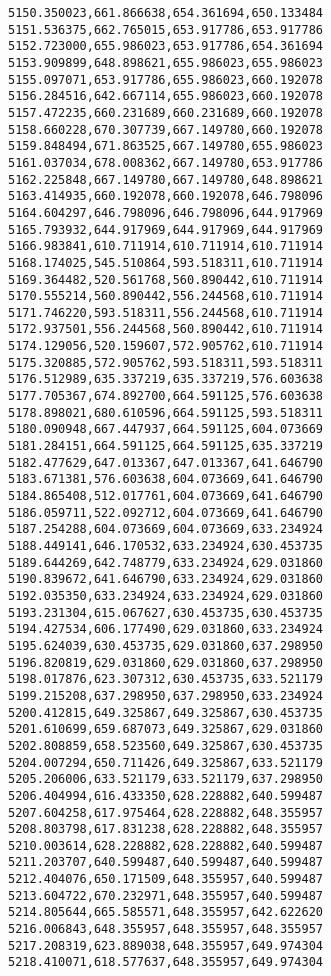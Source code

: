\documentclass[11pt]{article}
\begin{document}
\begin{Verbatim}[commandchars=\\\{\}]
5150.350023,661.866638,654.361694,650.133484
5151.536375,662.765015,653.917786,653.917786
5152.723000,655.986023,653.917786,654.361694
5153.909899,648.898621,655.986023,655.986023
5155.097071,653.917786,655.986023,660.192078
5156.284516,642.667114,655.986023,660.192078
5157.472235,660.231689,660.231689,660.192078
5158.660228,670.307739,667.149780,660.192078
5159.848494,671.863525,667.149780,655.986023
5161.037034,678.008362,667.149780,653.917786
5162.225848,667.149780,667.149780,648.898621
5163.414935,660.192078,660.192078,646.798096
5164.604297,646.798096,646.798096,644.917969
5165.793932,644.917969,644.917969,644.917969
5166.983841,610.711914,610.711914,610.711914
5168.174025,545.510864,593.518311,610.711914
5169.364482,520.561768,560.890442,610.711914
5170.555214,560.890442,556.244568,610.711914
5171.746220,593.518311,556.244568,610.711914
5172.937501,556.244568,560.890442,610.711914
5174.129056,520.159607,572.905762,610.711914
5175.320885,572.905762,593.518311,593.518311
5176.512989,635.337219,635.337219,576.603638
5177.705367,674.892700,664.591125,576.603638
5178.898021,680.610596,664.591125,593.518311
5180.090948,667.447937,664.591125,604.073669
5181.284151,664.591125,664.591125,635.337219
5182.477629,647.013367,647.013367,641.646790
5183.671381,576.603638,604.073669,641.646790
5184.865408,512.017761,604.073669,641.646790
5186.059711,522.092712,604.073669,641.646790
5187.254288,604.073669,604.073669,633.234924
5188.449141,646.170532,633.234924,630.453735
5189.644269,642.748779,633.234924,629.031860
5190.839672,641.646790,633.234924,629.031860
5192.035350,633.234924,633.234924,629.031860
5193.231304,615.067627,630.453735,630.453735
5194.427534,606.177490,629.031860,633.234924
5195.624039,630.453735,629.031860,637.298950
5196.820819,629.031860,629.031860,637.298950
5198.017876,623.307312,630.453735,633.521179
5199.215208,637.298950,637.298950,633.234924
5200.412815,649.325867,649.325867,630.453735
5201.610699,659.687073,649.325867,629.031860
5202.808859,658.523560,649.325867,630.453735
5204.007294,650.711426,649.325867,633.521179
5205.206006,633.521179,633.521179,637.298950
5206.404994,616.433350,628.228882,640.599487
5207.604258,617.975464,628.228882,648.355957
5208.803798,617.831238,628.228882,648.355957
5210.003614,628.228882,628.228882,640.599487
5211.203707,640.599487,640.599487,640.599487
5212.404076,650.171509,648.355957,640.599487
5213.604722,670.232971,648.355957,640.599487
5214.805644,665.585571,648.355957,642.622620
5216.006843,648.355957,648.355957,648.355957
5217.208319,623.889038,648.355957,649.974304
5218.410071,618.577637,648.355957,649.974304

\end{Verbatim}
\end{document}
